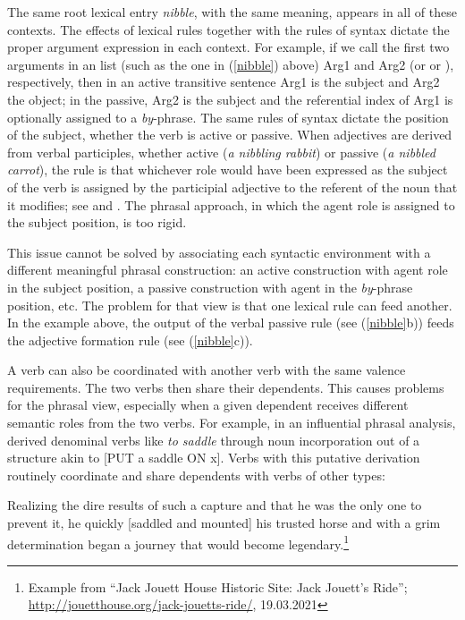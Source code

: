 \documentclass[output=paper,biblatex,babelshorthands,newtxmath,draftmode,colorlinks, citecolor=brown]{langscibook}
\begin{document}
The same root lexical entry \emph{nibble}, with the same meaning, appears in all of these contexts.
The effects of lexical rules together with the rules of syntax dictate the proper argument
expression in each context.  For example, if we call the first two arguments in an \argst list (such
as the one in (\ref{nibble}) above) Arg1 and Arg2 (or  or ), respectively,
then in an active transitive sentence Arg1 is the subject and Arg2 the object; in the passive, Arg2
is the subject and the referential index of Arg1 is optionally assigned to a \emph{by}-phrase.  The
same rules of syntax dictate the position of the subject, whether the verb is active or passive.
When adjectives are derived from verbal participles, whether active (\emph{a nibbling rabbit}) or
passive (\emph{a nibbled carrot}), the rule is that whichever role would have been expressed as the
subject of the verb is assigned by the participial adjective to the referent of the noun that it
modifies; see \citet[21--32]{Bresnan:1982passive} and \citet[Chapter~3]{Bresnan+etal:2015}.  The
phrasal approach, in which the agent role is assigned to the subject position, is too rigid.

This issue cannot be solved by associating each syntactic environment with a different meaningful
phrasal construction: an active construction with agent role in the subject position, a passive
construction with agent in the \textit{by}-phrase position, etc.  The problem for that view is that
one lexical rule can feed another.  In the example above, the output of the verbal passive rule (see
(\ref{nibble}b)) feeds the adjective formation rule (see (\ref{nibble}c)).

\largerpage[1.3] 
A verb can also be coordinated with another verb with the same valence requirements.  The two verbs
then share their dependents.  This causes problems for the phrasal view, especially when a given
dependent receives different semantic roles from the two verbs.  For example, in an influential
phrasal analysis, \citet{hale+keyser:1993} derived denominal verbs like \textit{to saddle} through
noun incorporation out of a structure akin to [PUT a saddle ON x].  Verbs with this putative
derivation routinely coordinate and share dependents with verbs of other types:

\begin{exe}
\ex Realizing the dire results of such a capture and that he was the only one to prevent it, he quickly
[saddled and mounted] his trusted horse and with a grim determination began a journey that would
become legendary.\footnote{Example from ``Jack Jouett House Historic Site: Jack Jouett's Ride''; \url{http://jouetthouse.org/jack-jouetts-ride/},
  19.03.2021}  
\end{exe}
\end{document}

